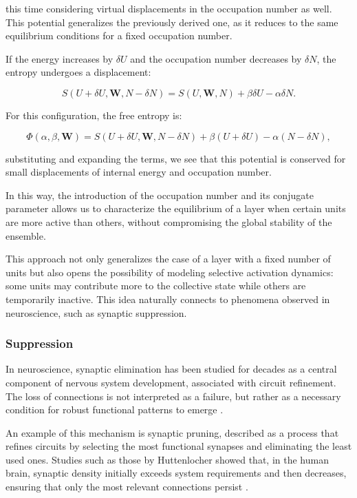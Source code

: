 \documentclass[12pt]{article}
\begin{document}
this time considering virtual displacements in the occupation number as well. This potential generalizes the previously derived one, as it reduces to the same equilibrium conditions for a fixed occupation number.

If the energy increases by $\delta U$ and the occupation number decreases by $\delta N$, the entropy undergoes a displacement:

\begin{equation}
S(U+\delta U, \mathbf{W}, N- \delta N) = S(U, \mathbf{W},N) +\beta \delta U - \alpha \delta N.
\end{equation}

For this configuration, the free entropy is:

\begin{equation}
\Phi(\alpha, \beta, \mathbf{W}) = S(U+\delta U, \mathbf{W}, N- \delta N) + \beta(U + \delta U) - \alpha (N-\delta N),
\end{equation}

substituting and expanding the terms, we see that this potential is conserved for small displacements of internal energy and occupation number.

In this way, the introduction of the occupation number and its conjugate parameter allows us to characterize the equilibrium of a layer when certain units are more active than others, without compromising the global stability of the ensemble.

This approach not only generalizes the case of a layer with a fixed number of units but also opens the possibility of modeling selective activation dynamics: some units may contribute more to the collective state while others are temporarily inactive. This idea naturally connects to phenomena observed in neuroscience, such as synaptic suppression.
\subsubsection*{Suppression}

In neuroscience, synaptic elimination has been studied for decades as a central component of nervous system development, associated with circuit refinement. The loss of connections is not interpreted as a failure, but rather as a necessary condition for robust functional patterns to emerge \cite{huttenlocher1979synaptic}.

An example of this mechanism is synaptic pruning, described as a process that refines circuits by selecting the most functional synapses and eliminating the least used ones. Studies such as those by Huttenlocher showed that, in the human brain, synaptic density initially exceeds system requirements and then decreases, ensuring that only the most relevant connections persist \cite{huttenlocher1979synaptic}.
\end{document}
